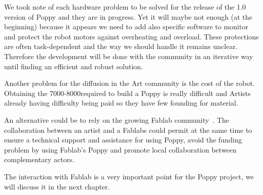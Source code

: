 We took note of each hardware problem to be solved for the release of the 1.0 version of Poppy and they are in progress. Yet it will maybe not enough (at the beginning) because it appears we need to add also specific software to monitor and protect the robot motors against overheating and overload. These protections are often task-dependent and the way we should handle it remains unclear. Therefore the development will be done with the community in an iterative way until finding an efficient and robust solution.

Another problem for the diffusion in the Art community is the cost of the robot. Obtaining the 7000-8000\texteuro required to build a Poppy is really difficult and Artists already having difficulty being paid so they have few founding for material.

An alternative could be to rely on the growing Fablab community~\cite{anderson}. The collaboration between an artist and a Fablabs could permit at the same time to ensure a technical support and assistance for using Poppy, avoid the funding problem by using Fablab's Poppy and promote local collaboration between complementary actors.

The interaction with Fablab is a very important point for the Poppy project, we will discuss it in the next chapter.
